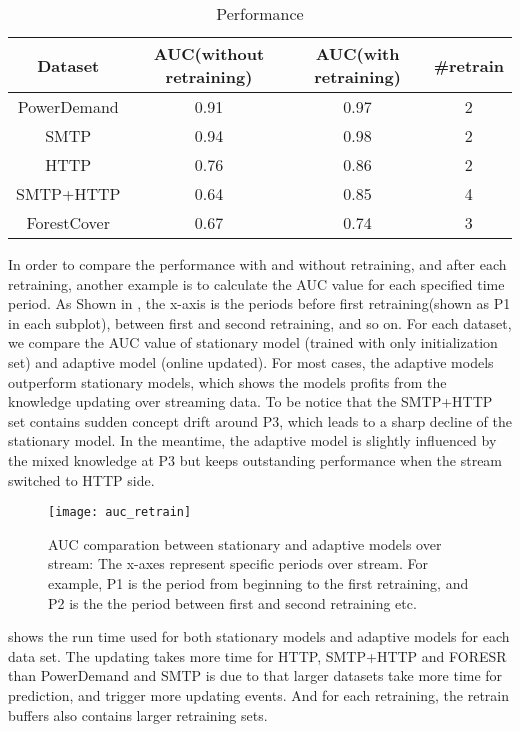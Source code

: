 \begin{table}[h] 
\caption{Performance} 
\centering      
\begin{tabular}{c | c | c | c}  
\hline  
Dataset & AUC(without retraining) & AUC(with retraining) & \#retrain \\ 
\hline 
PowerDemand & 0.91 & 0.97 & 2  \\  
\hline 
SMTP & 0.94 &  0.98 &  2 \\ 
\hline 
HTTP & 0.76 &  0.86 &  2 \\ 
\hline
SMTP+HTTP & 0.64 & 0.85 & 4 \\
\hline 
ForestCover &0.67&0.74 & 3\\   
\hline    
\end{tabular}
\label{tab:performance}  
\end{table} 
In order to compare the performance with and without retraining, and after each retraining, another example is to calculate the AUC value for each specified time period. As Shown in , the x-axis is the periods before first retraining(shown as P1 in each subplot), between first and second retraining, and so on. For each dataset, we compare the AUC value of stationary model (trained with only initialization set) and adaptive model (online updated). For most cases, the adaptive models outperform stationary models, which shows the models profits from the knowledge updating over streaming data. To be notice that the SMTP+HTTP set contains sudden concept drift around P3, which leads to a sharp decline of the stationary model. In the meantime, the adaptive model is slightly influenced by the mixed knowledge at P3 but keeps outstanding performance when the stream switched to HTTP side.\\
\begin{figure}[h]
\centering
\texttt{[image: auc\_retrain]}
\caption[AUC comparation between stationary and adaptive models over stream]{AUC comparation between stationary and adaptive models over stream: The x-axes represent specific periods over stream. For example, P1 is the period from beginning to the first retraining, and P2 is the the period between first and second retraining etc.}
\label{fig:auc_retrain}
\end{figure}

 shows the run time used for both stationary models and adaptive models for each data set. The updating takes more time for HTTP, SMTP+HTTP and FORESR than PowerDemand and SMTP is due to that larger datasets take more time for prediction, and trigger more updating events. And for each retraining, the retrain buffers also contains larger retraining sets.



